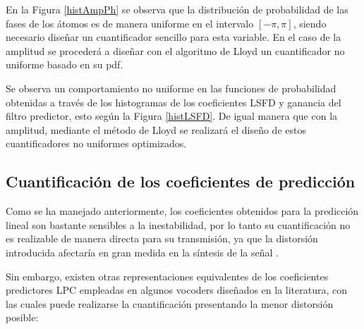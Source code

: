 En la Figura \ref{histAmpPh} se observa que la distribución de probabilidad de las fases de los átomos es de manera uniforme en el intervalo $[-\pi,\pi]$, siendo necesario diseñar un cuantificador sencillo para esta variable. En el caso de la amplitud se procederá a diseñar con el algoritmo de Lloyd un cuantificador no uniforme basado en su pdf.

Se observa un comportamiento no uniforme en las funciones de probabilidad obtenidas a través de los histogramas de los coeficientes LSFD y ganancia del filtro predictor, esto según la Figura \ref{histLSFD}. De igual manera que con la amplitud, mediante el método de Lloyd se realizará el diseño de estos cuantificadores no uniformes optimizados.

\subsection{Cuantificación de los coeficientes de predicción}
Como se ha manejado anteriormente, los coeficientes obtenidos para la predicción lineal son bastante sensibles a la inestabilidad, por lo tanto su cuantificación no es realizable de manera directa para su transmisión, ya que la distorsión introducida afectaría en gran medida en la síntesis de la señal \cite[]{Noah1984}.

Sin embargo, existen otras representaciones equivalentes de los coeficientes predictores LPC empleadas en algunos vocoders diseñados en la literatura, con las cuales puede realizarse la cuantificación presentando la menor distorsión posible:

